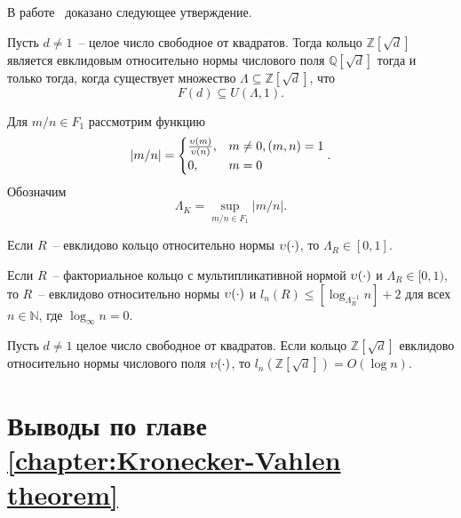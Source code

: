 \documentclass[_00_autoref.tex]{subfiles}
\begin{document}
В работе~\cite{source:Selfridge} доказано следующее утверждение.

\begin{statement}\label{proposition:fundamental_in_circle}
    Пусть $d \neq 1$~-- целое число свободное от квадратов.
    Тогда кольцо $\mathbb{Z}[\sqrt{d}]$ является евклидовым относительно нормы числового поля $\mathbb{Q}[\sqrt{d}]$ тогда и только тогда, когда существует множество $\Lambda \subseteq \mathbb{Z}[\sqrt{d}]$, что
    \begin{equation*}
        F(d) \subseteq U(\Lambda, 1).
    \end{equation*}
\end{statement}

\begin{definition}\label{definition:euclidean_lambda}
    Для $m/n \in F_1$ рассмотрим функцию
    \begin{equation*}
        |m/n| = \begin{cases}
            \frac{\upsilon(m)}{\upsilon(n)}, & m \neq 0, (m, n) = 1\\
            0, & m = 0
        \end{cases}.
    \end{equation*}
    Обозначим
    \begin{equation*}
        \Lambda_K = \sup_{m/n \in F_1} |m/n|.
    \end{equation*}
\end{definition}

\begin{theorem}\label{theorem:euclidean_and_lambda}
    Если $R$~-- евклидово кольцо относительно нормы $\upsilon(\cdot)$, то $\Lambda_R \in [0, 1]$.

    Если $R$~-- факториальное кольцо с мультипликативной нормой $\upsilon(\cdot)$ и $\Lambda_R \in [0, 1)$, то $R$~-- евклидово относительно нормы $\upsilon(\cdot)$ и $l_n(R) \le [\log_{\Lambda_R^{-1}} n] + 2$ для всех $n \in \mathbb{N}$, где $\log_{\infty} n = 0$.
\end{theorem}

\begin{theorem}
    Пусть $d \neq 1$ целое число свободное от квадратов.
    Если кольцо $\mathbb{Z}[\sqrt{d}]$ евклидово относительно нормы числового поля $\upsilon(\cdot)$, то $l_n(\mathbb{Z}[\sqrt{d}]) = O(\log n)$.
\end{theorem}

\section*{Выводы по главе \ref{chapter:Kronecker-Vahlen theorem}}
\end{document}
